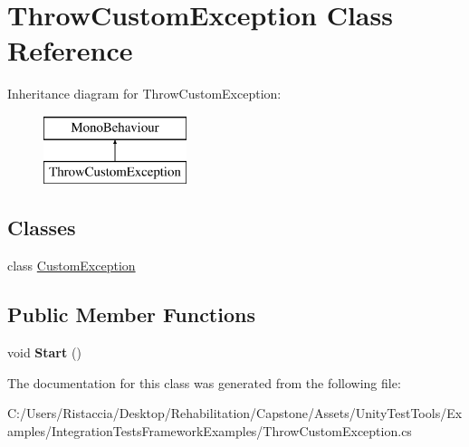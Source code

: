 \hypertarget{class_throw_custom_exception}{}\section{Throw\+Custom\+Exception Class Reference}
\label{class_throw_custom_exception}
Inheritance diagram for Throw\+Custom\+Exception\+:\begin{figure}[H]
\begin{center}
\leavevmode
\includegraphics[height=2.000000cm]{class_throw_custom_exception}
\end{center}
\end{figure}
\subsection*{Classes}
\begin{DoxyCompactItemize}
\item 
class \hyperlink{class_throw_custom_exception_1_1_custom_exception}{Custom\+Exception}
\end{DoxyCompactItemize}
\subsection*{Public Member Functions}
\begin{DoxyCompactItemize}
\item 
\mbox{\label{class_throw_custom_exception_a5fa1e0ed3e225075e842dc7498e9cd09}} 
void {\bfseries Start} ()
\end{DoxyCompactItemize}


The documentation for this class was generated from the following file\+:\begin{DoxyCompactItemize}
\item 
C\+:/\+Users/\+Ristaccia/\+Desktop/\+Rehabilitation/\+Capstone/\+Assets/\+Unity\+Test\+Tools/\+Examples/\+Integration\+Tests\+Framework\+Examples/Throw\+Custom\+Exception.\+cs\end{DoxyCompactItemize}
